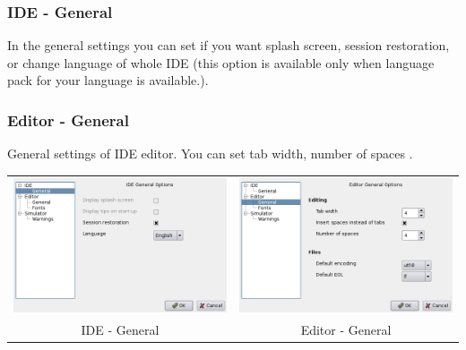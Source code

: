     \subsubsection{IDE - General}
        In the general settings you can set if you want splash screen, session restoration, or change language of whole
        IDE (this option is available only when language pack for your language is available.).

    \subsubsection{Editor - General}
        General settings of IDE editor. You can set tab width, number of spaces .

        \begin{table}[h!]
            \begin{tabular}{cc}
                \includegraphics[width=.5\textwidth]{img/interface1.png}
                    &
                \includegraphics[width=.5\textwidth]{img/interface2.png}
                    \\
                IDE - General & Editor - General
            \end{tabular}
        \end{table}


